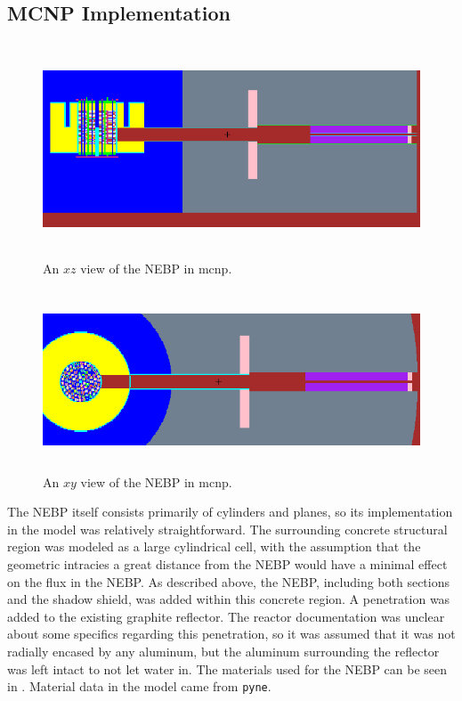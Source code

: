 \subsection{MCNP Implementation}

\begin{figure}[htb]
\centering
\includegraphics[height=2.5in]{tex/figures/mcnp_newxz.png}
\caption[MCNP NEBP $XZ$]{An $xz$ view of the NEBP in mcnp.}
\label{fig:mcnp_newxz}
\end{figure}

\begin{figure}[htb]
\centering
\includegraphics[height=2.1in]{tex/figures/mcnp_newxy.png}
\caption[MCNP NEBP $XY$]{An $xy$ view of the NEBP in mcnp.}
\label{fig:mcnp_newxy}
\end{figure}


The NEBP itself consists primarily of cylinders and planes, so its implementation in the model was relatively straightforward.
The surrounding concrete structural region was modeled as a large cylindrical cell, with the assumption that the geometric intracies a great distance from the NEBP would have a minimal effect on the flux in the NEBP.
As described above, the NEBP, including both sections and the shadow shield, was added within this concrete region.
A penetration was added to the existing graphite reflector.
The reactor documentation was unclear about some specifics regarding this penetration, so it was assumed that it was not radially encased by any aluminum, but the aluminum surrounding the reflector was left intact to not let water in.
The materials used for the NEBP can be seen in .
Material data in the model came from {\tt pyne}.


